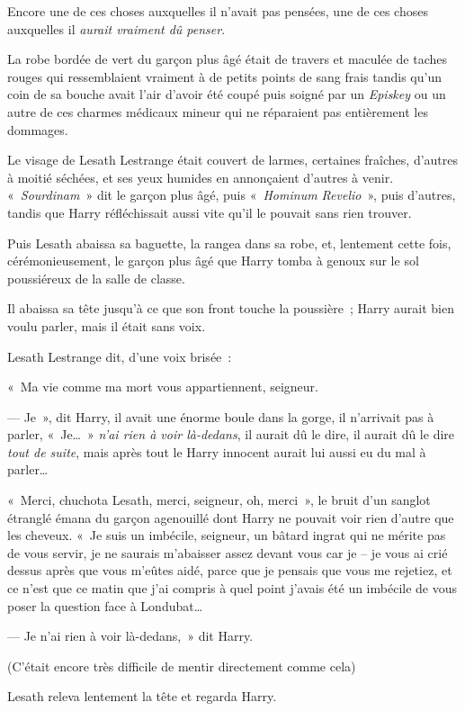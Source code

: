 Encore une de ces choses auxquelles il n'avait pas pensées, une de ces choses auxquelles il \emph{aurait vraiment dû penser}.

La robe bordée de vert du garçon plus âgé était de travers et maculée de taches rouges qui ressemblaient vraiment à de petits points de sang frais tandis qu'un coin de sa bouche avait l'air d'avoir été coupé puis soigné par un \emph{Episkey} ou un autre de ces charmes médicaux mineur qui ne réparaient pas entièrement les dommages.

Le visage de Lesath Lestrange était couvert de larmes, certaines fraîches, d'autres à moitié séchées, et ses yeux humides en annonçaient d'autres à venir.
«~\emph{Sourdinam}~» dit le garçon plus âgé, puis «~\emph{Hominum Revelio}~», puis d'autres, tandis que Harry réfléchissait aussi vite qu'il le pouvait sans rien trouver.

Puis Lesath abaissa sa baguette, la rangea dans sa robe, et, lentement cette fois, cérémonieusement, le garçon plus âgé que Harry tomba à genoux sur le sol poussiéreux de la salle de classe.

Il abaissa sa tête jusqu'à ce que son front touche la poussière~; Harry aurait bien voulu parler, mais il était sans voix.

Lesath Lestrange dit, d'une voix brisée~:

«~Ma vie comme ma mort vous appartiennent, seigneur.

--- Je~», dit Harry, il avait une énorme boule dans la gorge, il n'arrivait pas à parler, «~Je…~»
\emph{n'ai rien à voir là-dedans}, il aurait dû le dire, il aurait dû le dire \emph{tout de suite}, mais après tout le Harry innocent aurait lui aussi eu du mal à parler…

«~Merci, chuchota Lesath, merci, seigneur, oh, merci~», le bruit d'un sanglot étranglé émana du garçon agenouillé dont Harry ne pouvait voir rien d'autre que les cheveux.
«~Je suis un imbécile, seigneur, un bâtard ingrat qui ne mérite pas de vous servir, je ne saurais m'abaisser assez devant vous car je -- je vous ai crié dessus après que vous m'eûtes aidé, parce que je pensais que vous me rejetiez, et ce n'est que ce matin que j'ai compris à quel point j'avais été un imbécile de vous poser la question face à Londubat…

--- Je n'ai rien à voir là-dedans,~» dit Harry.

(C'était encore très difficile de mentir directement comme cela)

Lesath releva lentement la tête et regarda Harry.

